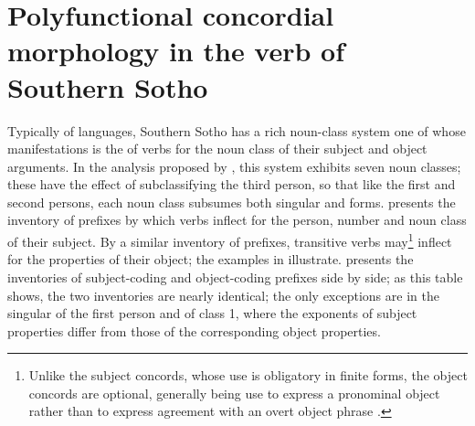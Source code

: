 \documentclass[output=paper,
modfonts
]{LSP/langsci}
\begin{document}
\section{Polyfunctional concordial morphology in the verb  of Southern Sotho}\label{sec:stump:3}
Typically of  languages, Southern Sotho has a rich noun\nobreakdash-class system one of whose manifestations is the  of verbs for the noun class of their subject and object arguments.  In the analysis proposed by  \citet{doke1985}, this system exhibits seven noun classes; these have the effect of subclassifying the third person, so that like the first and second persons, each noun class subsumes both singular and  forms.   presents the inventory of prefixes by which verbs inflect for the person, number and noun class of their subject.  By a similar inventory of prefixes, transitive verbs may\footnote{Unlike the subject concords, whose use is obligatory in finite forms, the object concords are optional, generally being use to express a pronominal object rather than to express agreement with an overt object phrase \citep[242]{doke1985}.} inflect for the properties of their object; the examples in  illustrate.   presents the inventories of subject\nobreakdash-coding and object\nobreakdash-coding prefixes side by side; as this table shows, the two inventories are nearly identical; the only exceptions are in the singular of the first person and of class 1, where the exponents of subject properties differ from those of the corresponding object properties.
\end{document}
